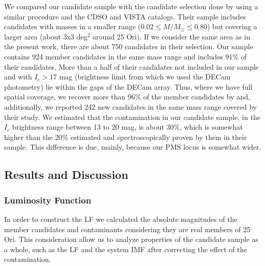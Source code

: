 \documentclass[12pt]{article}
\begin{document}
We compared our candidate sample with the candidate selection done by \citet{Downes2014} using a similar procedure and the CDSO and VISTA catalogs. Their sample includes candidates with masses in a smaller range ($0.02\le M/M_\odot\le0.80$) but covering a larger area (about 3x3 deg$^2$ around 25 Ori). If we consider the same area as in the present work, there are about 750 candidates in their selection. Our sample contains 924 member candidates in the same mass range and includes 91\% of their candidates. More than a half of their candidates not included in our sample and with $I_c>17$ mag (brightness limit from which we used the DECam photometry) lie within the gaps of the DECam array. Thus, where we have full spatial coverage, we recover more than 96\% of the member candidates by \citet{Downes2014} and, additionally, we reported 242 new candidates in the same mass range covered by their study. We estimated that the contamination in our candidate sample, in the $I_c$ brightness range between 13 to 20 mag, is about 30\%, which is somewhat higher than the 20\% estimated and spectroscopically proven by them in their sample. This difference is due, mainly, because our PMS locus is somewhat wider.

\subsection{Results and Discussion}
\label{sec_IMF:results}

\subsubsection{Luminosity Function}
\label{sec_IMF:LF}
In order to construct the LF we calculated the absolute magnitudes of the member candidates and contaminants considering they are real members of 25 Ori. This consideration allow us to analyze properties of the candidate sample as a whole, such as the LF and the system IMF after correcting the effect of the contamination.
\end{document}

